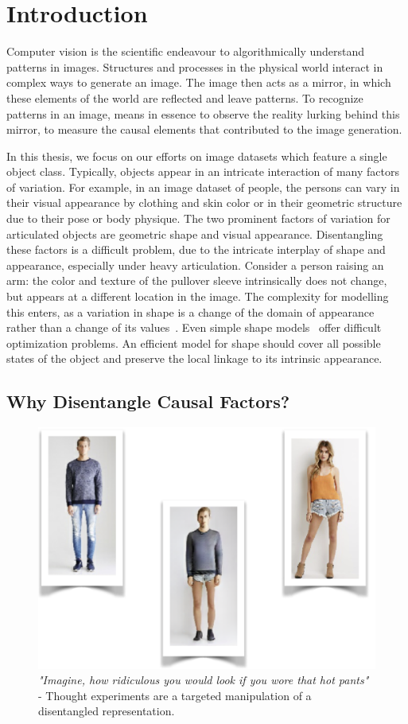 \chapter{Introduction}\label{sec:introduction}
	Computer vision is the scientific endeavour to algorithmically understand patterns in images.
	Structures and processes in the physical world interact in complex ways to generate an image. The image then acts as a mirror, in which these elements of the world are reflected and leave patterns.
	To recognize patterns in an image, means in essence to observe the reality lurking behind this mirror, \ie to measure the causal elements that contributed to the image generation.

	In this thesis, we focus on our efforts on image datasets which feature a single object class.
	Typically, objects appear in an intricate interaction of many factors of variation.
	For example, in an image dataset of people, the persons can vary in their visual appearance by clothing and skin color or in their geometric structure due to their pose or body physique.
	The two prominent factors of variation for articulated objects are geometric shape and visual appearance.
	Disentangling these factors is a difficult problem, due to the intricate interplay of shape and appearance, especially under heavy articulation.
	Consider a person raising an arm: the color and texture of the pullover sleeve intrinsically does not change, but appears at a different location in the image.
	The complexity for modelling this enters, as a variation in shape is a change of the domain of appearance rather than a change of its values~\cite{shu18shapeappear}.
	Even simple shape models~\cite{cootes98activeappear} offer difficult optimization problems.
	An efficient model for shape should cover all possible states of the object and preserve the local linkage to its intrinsic appearance.

\section{Why Disentangle Causal Factors?}
	\begin{figure}[htp]
		\centering
		\includegraphics[trim={0cm 0cm 0cm 0cm},clip, width=0.5\linewidth]{fig/other/hotpants}
		\caption{\textit{"Imagine, how ridiculous you would look if you wore that hot pants"} - Thought experiments are a targeted manipulation of a disentangled representation.}
		\label{fig:hotpants}
	\end{figure}

